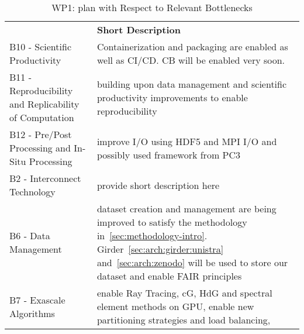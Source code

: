 \begin{table}[!ht]
    \centering

    {
        \setlength{\parindent}{0pt}
        \def\arraystretch{1.25}
        {
            \fontsize{9}{11}\selectfont
            \begin{tabular}{!{\color{numpexgray}\vrule}p{.25\linewidth}!{\color{numpexgray}\vrule}p{.6885\linewidth}!{\color{numpexgray}\vrule}}

     &  {\rule{0pt}{2.5ex}\color{white}\bf Short Description }\\

    B10 - Scientific Productivity & Containerization and packaging are enabled as well as \ac{CI}/\ac{CD}. \ac{CB} will be enabled very soon.\\
    B11 - Reproducibility and Replicability of Computation & building upon data management and scientific productivity improvements to enable reproducibility \\
    B12 - Pre/Post Processing and In-Situ Processing & improve I/O using HDF5 and MPI I/O and possibly used framework from \ac{PC3}\\
    B2 - Interconnect Technology & provide short description here \\
    B6 - Data Management & dataset creation and management are being improved to satisfy the methodology in~\cref{sec:methodology-intro}. Girder~\cref{sec:arch:girder:unistra} and~\cref{sec:arch:zenodo}  will be used to store our dataset and enable FAIR principles\\
    B7 - Exascale Algorithms & enable Ray Tracing, cG, HdG and spectral element methods  on GPU, enable new partitioning strategies and load balancing,  \\
\hline
\end{tabular}
        }
    }
    \caption{WP1: \Feelpp plan with Respect to Relevant Bottlenecks}
    \label{tab:WP1:Feelpp:bottlenecks}
\end{table}
